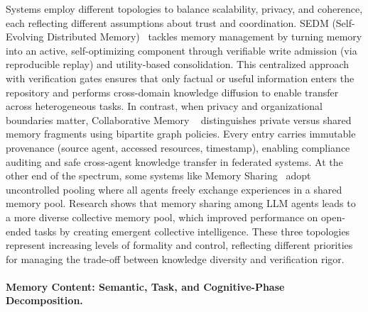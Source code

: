 Systems employ different topologies to balance scalability, privacy, and coherence, each reflecting different assumptions about trust and coordination. SEDM (Self-Evolving Distributed Memory)~\cite{xu2025sedm} tackles memory management by turning memory into an active, self-optimizing component through verifiable write admission (via reproducible replay) and utility-based consolidation. This centralized approach with verification gates ensures that only factual or useful information enters the repository and performs cross-domain knowledge diffusion to enable transfer across heterogeneous tasks. In contrast, when privacy and organizational boundaries matter, Collaborative Memory ~\cite{rezazadeh2025collaborative} distinguishes private versus shared memory fragments using bipartite graph policies. Every entry carries immutable provenance (source agent, accessed resources, timestamp), enabling compliance auditing and safe cross-agent knowledge transfer in federated systems. At the other end of the spectrum, some systems like Memory Sharing~\cite{gao2024memory} adopt uncontrolled pooling where all agents freely exchange experiences in a shared memory pool. Research shows that memory sharing among LLM agents leads to a more diverse collective memory pool, which improved performance on open-ended tasks by creating emergent collective intelligence. These three topologies represent increasing levels of formality and control, reflecting different priorities for managing the trade-off between knowledge diversity and verification rigor.


\paragraph{Memory Content: Semantic, Task, and Cognitive-Phase Decomposition.}


